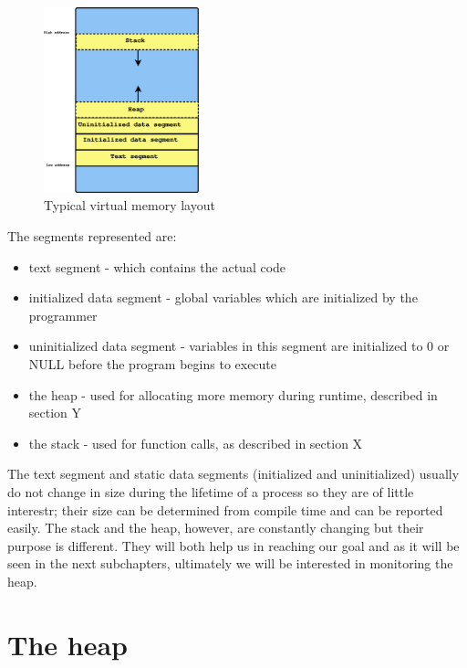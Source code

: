 \begin{figure}[htb]
\centering
\includegraphics[width=0.4\textwidth]{src/img/virtmemlayout}
\caption{Typical virtual memory layout}
\label{fig:virtmemlayout}
\end{figure}

The segments represented are:
\begin{itemize}
\item text segment - which contains the actual code
\item initialized data segment - global variables which are initialized by the programmer
\item uninitialized data segment - variables in this segment are initialized to 0 or NULL before the program begins to execute
\item the heap - used for allocating more memory during runtime, described in section Y
\item the stack - used for function calls, as described in section X
\end{itemize}

The text segment and static data segments (initialized and uninitialized) usually do not change in size during the lifetime of a process so they are of little interestr; their size can be determined from compile time and can be reported easily. The stack and the heap, however, are constantly changing but their purpose is different. They will both help us in reaching our goal and as it will be seen in the next subchapters, ultimately we will be interested in monitoring the heap.

\section{The heap}
\label{section:heap}

